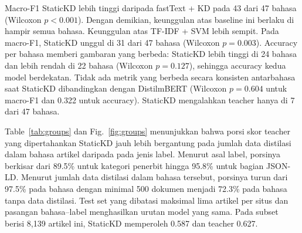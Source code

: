 \documentclass[journal]{IEEEtran}
\begin{document}
Macro-F1 StaticKD lebih tinggi daripada fastText + KD pada 43 dari 47 bahasa (Wilcoxon $p<0.001$). Dengan demikian, keunggulan atas baseline ini berlaku di hampir semua bahasa. Keunggulan atas TF-IDF + SVM lebih sempit. Pada macro-F1, StaticKD unggul di 31 dari 47 bahasa (Wilcoxon $p=0.003$). Accuracy per bahasa memberi gambaran yang berbeda: StaticKD lebih tinggi di 24 bahasa dan lebih rendah di 22 bahasa (Wilcoxon $p=0.127$), sehingga accuracy kedua model berdekatan. Tidak ada metrik yang berbeda secara konsisten antarbahasa saat StaticKD dibandingkan dengan DistilmBERT (Wilcoxon $p=0.604$ untuk macro-F1 dan 0.322 untuk accuracy). StaticKD mengalahkan teacher hanya di 7 dari 47 bahasa.

Table~\ref{tab:groups} dan Fig.~\ref{fig:groups} menunjukkan bahwa porsi skor teacher yang dipertahankan StaticKD jauh lebih bergantung pada jumlah data distilasi dalam bahasa artikel daripada pada jenis label. Menurut asal label, porsinya berkisar dari 89.5\% untuk kategori penerbit hingga 95.8\% untuk bagian JSON-LD. Menurut jumlah data distilasi dalam bahasa tersebut, porsinya turun dari 97.5\% pada bahasa dengan minimal 500 dokumen menjadi 72.3\% pada bahasa tanpa data distilasi. Test set yang dibatasi maksimal lima artikel per situs dan pasangan bahasa--label menghasilkan urutan model yang sama. Pada subset berisi 8,139 artikel ini, StaticKD memperoleh 0.587 dan teacher 0.627.
\end{document}
